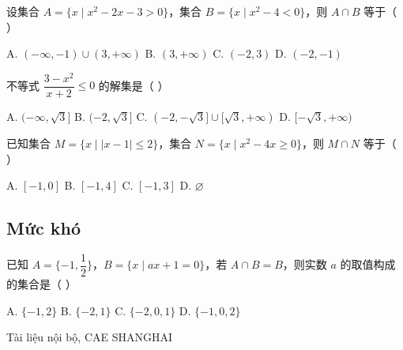 \documentclass[11pt, a4paper]{article}
\begin{document}
\begin{baitap}[7]
设集合 $A=\{x\mid x^2-2x-3>0\}$，集合 $B=\{x\mid x^2-4<0\}$，则 $A\cap B$ 等于（ ）
\par\vspace{3pt}
\noindent A. $(-\infty,-1)\cup(3,+\infty)$ \quad B. $(3,+\infty)$ \quad C. $(-2,3)$ \quad D. $(-2,-1)$
\end{baitap}
\begin{baitap}[8]
不等式 $\dfrac{3-x^2}{x+2}\le0$ 的解集是（ ）
\par\vspace{3pt}
\noindent A. $(-\infty,\sqrt{3}]$ \quad B. $(-2,\sqrt{3}]$ \quad C. $(-2,-\sqrt{3}]\cup[\sqrt{3},+\infty)$ \quad D. $[-\sqrt{3},+\infty)$
\end{baitap}
\begin{baitap}[9]
已知集合 $M=\{x\mid |x-1|\le2\}$，集合 $N=\{x\mid x^2-4x\ge0\}$，则 $M\cap N$ 等于（ ）
\par\vspace{3pt}
\noindent A. $[-1,0]$ \quad B. $[-1,4]$ \quad C. $[-1,3]$ \quad D. $\varnothing$
\end{baitap}
\subsection{Mức khó}

\begin{baitap}[10]
已知 $A=\{-1,\dfrac{1}{2}\}$，$B=\{x\mid ax+1=0\}$，若 $A\cap B=B$，则实数 $a$ 的取值构成的集合是（ ）
\par\vspace{3pt}
\noindent A. $\{-1,2\}$ \quad B. $\{-2,1\}$ \quad C. $\{-2,0,1\}$ \quad D. $\{-1,0,2\}$
\end{baitap}
\vspace{0.8cm}
\begin{center}
{\footnotesize\color{cae_blue} Tài liệu nội bộ, CAE SHANGHAI}
\end{center}
\end{document}
